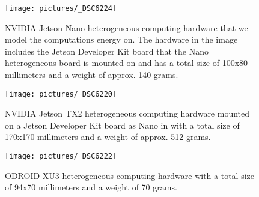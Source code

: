 \begin{figure}[h!]
  \sfr
  \centering 
  \texttt{[image: pictures/\_DSC6224]}
  \caption[NVIDIA Jetson Nano heterogeneous computing hardware]{NVIDIA Jetson Nano heterogeneous computing hardware that we model the computations energy on. The hardware in the image includes the Jetson Developer Kit board that the Nano heterogeneous board is mounted on and has a total size of 100x80 millimeters and a weight of approx. 140 grams.}  
  \label{fig:nano}
  \efr
\end{figure}
\begin{figure}[h!]   
  \sfr
  \centering 
  \texttt{[image: pictures/\_DSC6220]}
  \caption[NVIDIA Jetson TX2 heterogeneous computing hardware]{NVIDIA Jetson TX2 heterogeneous computing hardware mounted on a Jetson Developer Kit board as Nano in  with a total size of 170x170 millimeters and a weight of approx. 512 grams.}   
  \label{fig:tx2}
  \efr
\end{figure}
\begin{figure}[h!]
  \sfr
  \centering
  \texttt{[image: pictures/\_DSC6222]}
  \caption[ODROID XU3 heterogeneous computing hardware]{ODROID XU3 heterogeneous computing hardware with a total size of 94x70 millimeters and a weight of 70 grams.}
  \label{fig:odroid}
  \efr
\end{figure}

